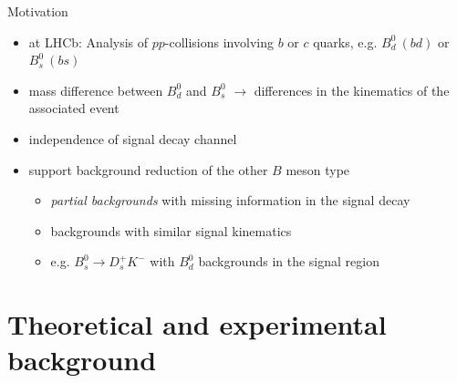 \documentclass[aspectratio=1610, 10pt]{beamer}
\begin{document}
\begin{frame}{Motivation}
  \begin{itemize}
    \item at LHCb: Analysis of $pp$-collisions involving $b$ or $c$ quarks, e.g. $B^0_d \: (bd)$ or $B^0_s \: (bs)$
    \item mass difference between $B^0_d$ and $B^0_s$ $\rightarrow$ differences in the kinematics of the associated event
    \item independence of signal decay channel
    \item support background reduction of the other $B$ meson type
    \begin{itemize}
      \item \textit{partial backgrounds} with missing information in the signal decay
      \item backgrounds with similar signal kinematics
      \item e.g. $B^0_s \rightarrow D^+_s K^-$ with $B^0_d$ backgrounds in the signal region
    \end{itemize}
  \end{itemize}
\end{frame}

\section*{Theoretical and experimental background}

%
\end{document}

